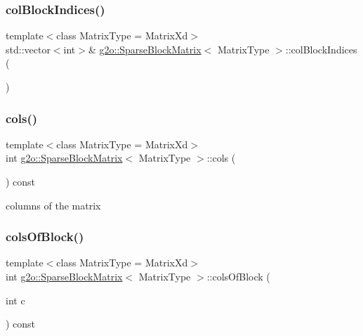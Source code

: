 \subsubsection{\texorpdfstring{col\+Block\+Indices()}{colBlockIndices()}\hspace{0.1cm}{\footnotesize\ttfamily [2/2]}}
{\footnotesize\ttfamily template$<$class Matrix\+Type = Matrix\+Xd$>$ \\
std\+::vector$<$int$>$\& \mbox{\hyperlink{classg2o_1_1_sparse_block_matrix}{g2o\+::\+Sparse\+Block\+Matrix}}$<$ Matrix\+Type $>$\+::col\+Block\+Indices (\begin{DoxyParamCaption}{ }\end{DoxyParamCaption})\hspace{0.3cm}{\ttfamily [inline]}}

\mbox{\label{classg2o_1_1_sparse_block_matrix_ac9dfcc991976a6c21dcbed961f06282d}} 
\subsubsection{\texorpdfstring{cols()}{cols()}}
{\footnotesize\ttfamily template$<$class Matrix\+Type = Matrix\+Xd$>$ \\
int \mbox{\hyperlink{classg2o_1_1_sparse_block_matrix}{g2o\+::\+Sparse\+Block\+Matrix}}$<$ Matrix\+Type $>$\+::cols (\begin{DoxyParamCaption}{ }\end{DoxyParamCaption}) const\hspace{0.3cm}{\ttfamily [inline]}}



columns of the matrix 

\mbox{\label{classg2o_1_1_sparse_block_matrix_afe3ef87aecd7a76eab27e91131dbe0c1}} 
\subsubsection{\texorpdfstring{cols\+Of\+Block()}{colsOfBlock()}}
{\footnotesize\ttfamily template$<$class Matrix\+Type = Matrix\+Xd$>$ \\
int \mbox{\hyperlink{classg2o_1_1_sparse_block_matrix}{g2o\+::\+Sparse\+Block\+Matrix}}$<$ Matrix\+Type $>$\+::cols\+Of\+Block (\begin{DoxyParamCaption}\item[{int}]{c }\end{DoxyParamCaption}) const\hspace{0.3cm}{\ttfamily [inline]}}



